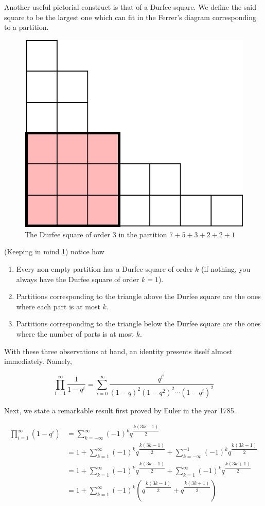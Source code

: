 Another useful pictorial construct is that of a Durfee square. We define the said square to be the largest one which can fit in the Ferrer’s diagram corresponding to a partition.
\begin{figure}[H]
    \centering
    \includegraphics[width=0.5\linewidth]{Images/Figure19.png}
    \caption{The Durfee square of order $3$ in the partition $7+5+3+2+2+1$}
    \label{DurfeeExample}
\end{figure}
(Keeping in mind \cref{DurfeeExample}) notice how
\begin{enumerate}
    \item Every non-empty partition has a Durfee square of order $k$ (if nothing, you always have the Durfee square of order $k=1$).
    \item Partitions corresponding to the triangle above the Durfee square are the ones where each part is at most $k$.
    \item Partitions corresponding to the triangle below the Durfee square are the ones where the number of parts is at most $k$. 
\end{enumerate}
With these three observations at hand, an identity presents itself almost immediately. Namely,
\begin{claim}
    \[
    \prod_{i=1}^{\infty}\dfrac{1}{1-q^i} = \sum_{i=0}^{\infty}\dfrac{q^{i^2}}{(1-q)^2(1-q^2)^2\cdots(1-q^i)^2}
    \]
    \label{c:DurfeeId1}
\end{claim}
Next, we state a remarkable result first proved by Euler in the year 1785.
\begin{theorem}
\begin{align*}
\prod_{i=1}^{\infty}(1-q^i) &= \sum_{k=-\infty}^{\infty}(-1)^k q^{\dfrac{k(3k-1)}{2}} \\
&= 1+\sum_{k=1}^{\infty}(-1)^kq^{\dfrac{k(3k-1)}{2}}+\sum_{k=-\infty}^{-1}(-1)^kq^{\dfrac{k(3k-1)}{2}} \\
&= 1+\sum_{k=1}^{\infty}(-1)^kq^{\dfrac{k(3k-1)}{2}}+\sum_{k=1}^{\infty}(-1)^kq^{\dfrac{k(3k+1)}{2}} \\
&= 1+\sum_{k=1}^{\infty}(-1)^k \left(q^{\dfrac{k(3k-1)}{2}}+q^{\dfrac{k(3k+1)}{2}}\right) \\
\end{align*}
\label{t:EPT}
\end{theorem}
